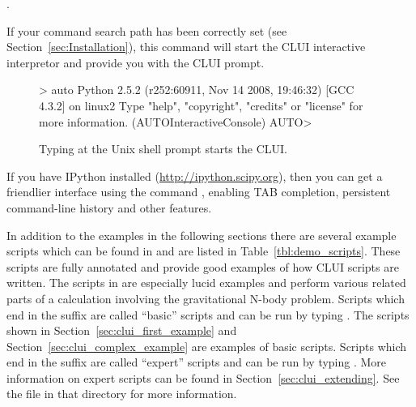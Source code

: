 \documentclass[12pt]{report}
\begin{document}
 \centerline {.}

 If your command search path has been correctly set (see
 Section~\ref{sec:Installation}), this command will start the \AUTO CLUI
 interactive interpretor and provide you with the \AUTO CLUI prompt.

 \begin{figure}[htbp]
 {\small 
 \begin{center} \begin{boxedverbatim}
 > auto
 Python 2.5.2 (r252:60911, Nov 14 2008, 19:46:32) 
 [GCC 4.3.2] on linux2
 Type "help", "copyright", "credits" or "license" for more information.
 (AUTOInteractiveConsole)
 AUTO>
 \end{boxedverbatim}
 \end{center}
 }
 \caption[Starting the \AUTO CLUI.]
 {Typing  at the Unix shell prompt starts the
 \AUTO CLUI.  }
 \label{exa:clui_starting}
 \end{figure}

 If you have IPython installed (\url{http://ipython.scipy.org}), then
 you can get a friendlier interface using the command
 , enabling TAB completion, persistent command-line
 history and other features.

 In addition to the examples in the following sections there are
 several example scripts which can be found in
  and are listed in
 Table~\ref{tbl:demo_scripts}.  These scripts are fully annotated and
 provide good examples of how \AUTO CLUI scripts are written.  The
 scripts in  are especially lucid
 examples and perform various related parts of a calculation involving
 the gravitational N-body problem.  
 Scripts which end in the
 suffix  are called ``basic'' scripts and can
 be run by typing .
 The scripts shown in Section~\ref{sec:clui_first_example}
 and Section~\ref{sec:clui_complex_example} are examples
 of basic scripts.
 Scripts which end in the
 suffix  are called ``expert'' scripts and can
 be run by typing .
 More information on expert scripts can be 
 found in Section~\ref{sec:clui_extending}.
 See the  file in that
 directory for more information.
\end{document}
